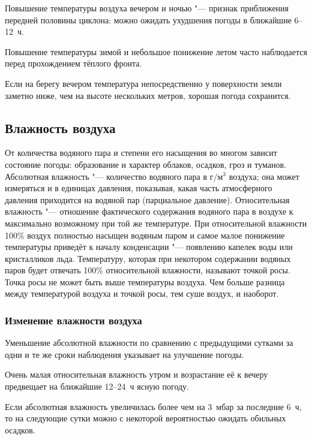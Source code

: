  Повышение температуры воздуха вечером и ночью "--- признак
приближения передней половины циклона: можно ожидать ухудшения погоды
в ближайшие 6--12~ч.

 Повышение температуры зимой и небольшое понижение летом часто
наблюдается перед прохождением тёплого фронта.

 Если на берегу вечером температура непосредственно у
поверхности земли заметно ниже, чем на высоте нескольких метров,
хорошая погода сохранится.

\subsection{Влажность воздуха}

От количества водяного пара и степени его насыщения во многом зависит
состояние погоды: образование и характер облаков, осадков, гроз и
туманов. Абсолютная влажность "--- количество водяного пара в г$/$м$^3$
воздуха; она может измеряться и в единицах давления, показывая, какая
часть атмосферного давления приходится на водяной пар (парциальное
давление). Относительная влажность "--- отношение фактического содержания
водяного пара в воздухе к максимально возможному при той же
температуре. При относительной влажности 100\% воздух полностью
насыщен водяным паром и самое малое понижение температуры приведёт к
началу конденсации "--- появлению капелек воды или кристалликов
льда. Температуру, которая при некотором содержании водяных паров
будет отвечать 100\% относительной влажности, называют точкой
росы. Точка росы не может быть выше температуры воздуха. Чем больше
разница между температурой воздуха и точкой росы, тем суше воздух, и
наоборот.

\subsubsection{Изменение влажности воздуха}

 Уменьшение абсолютной влажности по сравнению с предыдущими
сутками за одни и те же сроки наблюдения указывает на улучшение
погоды.

 Очень малая относительная влажность утром и возрастание её к
вечеру предвещает на ближайшие 12--24~ч ясную погоду.

 Если абсолютная влажность увеличилась более чем на 3~мбар за
последние 6~ч, то на следующие сутки можно с некоторой вероятностью
ожидать обильных осадков.

